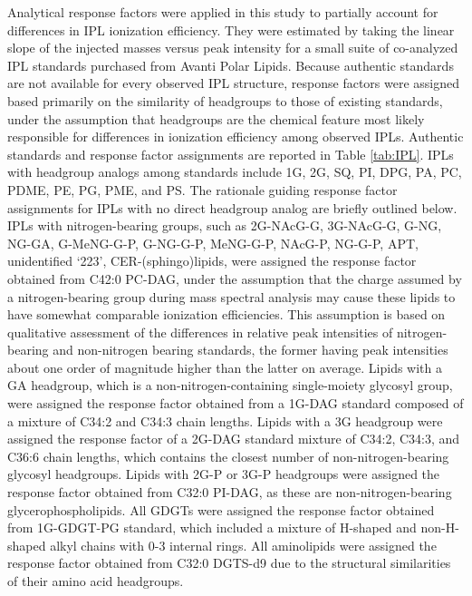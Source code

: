 Analytical response factors were applied in this study to partially account for differences in IPL ionization efficiency. They were estimated by taking the linear slope of the injected masses versus peak intensity for a small suite of co-analyzed IPL standards purchased from Avanti Polar Lipids. Because authentic standards are not available for every observed IPL structure, response factors were assigned based primarily on the similarity of headgroups to those of existing standards, under the assumption that headgroups are the chemical feature most likely responsible for differences in ionization efficiency among observed IPLs. Authentic standards and response factor assignments are reported in Table \ref{tab:IPL}. IPLs with headgroup analogs among standards include 1G, 2G, SQ, PI, DPG, PA, PC, PDME, PE, PG, PME, and PS. The rationale guiding response factor assignments for IPLs with no direct headgroup analog are briefly outlined below. IPLs with nitrogen-bearing groups, such as 2G-NAcG-G, 3G-NAcG-G, G-NG, NG-GA, G-MeNG-G-P, G-NG-G-P, MeNG-G-P, NAcG-P, NG-G-P, APT, unidentified `223', CER-(sphingo)lipids, were assigned the response factor obtained from C42:0 PC-DAG, under the assumption that the charge assumed by a nitrogen-bearing group during mass spectral analysis may cause these lipids to have somewhat comparable ionization efficiencies. This assumption is based on qualitative assessment of the differences in relative peak intensities of nitrogen-bearing and non-nitrogen bearing standards, the former having peak intensities about one order of magnitude higher than the latter on average. Lipids with a GA headgroup, which is a non-nitrogen-containing single-moiety glycosyl group, were assigned the response factor obtained from a 1G-DAG standard composed of a mixture of C34:2 and C34:3 chain lengths. Lipids with a 3G headgroup were assigned the response factor of a 2G-DAG standard mixture of C34:2, C34:3, and C36:6 chain lengths, which contains the closest number of non-nitrogen-bearing glycosyl headgroups. Lipids with 2G-P or 3G-P headgroups were assigned the response factor obtained from C32:0 PI-DAG, as these are non-nitrogen-bearing glycerophospholipids. All GDGTs were assigned the response factor obtained from 1G-GDGT-PG standard, which included a mixture of H-shaped and non-H-shaped alkyl chains with 0-3 internal rings. All aminolipids were assigned the response factor obtained from C32:0 DGTS-d9 due to the structural similarities of their amino acid headgroups.


